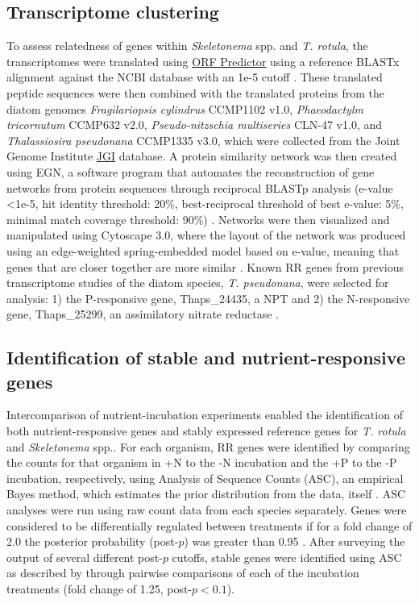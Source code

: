 \subsection{Transcriptome clustering}
To assess relatedness of genes within \textit{Skeletonema} spp. and \textit{T. rotula}, the transcriptomes were translated using \href{http://proteomics.ysu.edu/tools/OrfPredictor.html}{ORF Predictor} using a reference BLASTx alignment against the NCBI database with an 1e-5 cutoff \citep{Min2005}. These translated peptide sequences were then combined with the translated proteins from the diatom genomes \textit{Fragilariopsis cylindrus} CCMP1102 v1.0, \textit{Phaeodactylm tricornutum} CCMP632 v2.0, \textit{Pseudo-nitzschia multiseries} CLN-47 v1.0, and \textit{Thalassiosira pseudonana} CCMP1335 v3.0, which were collected from the Joint Genome Institute \href{http://genome.jgi-psf.org}{JGI} database. A protein similarity network was then created using EGN, a software program that automates the reconstruction of gene networks from protein sequences through reciprocal BLASTp analysis (e-value <1e-5, hit identity threshold: 20\%, best-reciprocal threshold of best e-value: 5\%, minimal match coverage threshold: 90\%) \citep{Halary2013, Halary2010}. Networks were then visualized and manipulated using Cytoscape 3.0, where the layout of the network was produced using an edge-weighted spring-embedded model based on e-value, meaning that genes that are closer together are more similar \citep{Smoot2011, Saito2012}. Known RR genes from previous transcriptome studies of the diatom species, \textit{T. pseudonana}, were selected for analysis: 1) the P-responsive gene, Thaps\_24435, a NPT \citep{Dyhrman2012} and 2) the N-responsive gene, Thaps\_25299, an assimilatory nitrate reductase \citep{Bender2014}. 
\subsection{Identification of stable and nutrient-responsive genes}
Intercomparison of nutrient-incubation experiments enabled the identification of both nutrient-responsive genes and stably expressed reference genes for \textit{T. rotula} and \textit{Skeletonema} spp.. For each organism, RR genes were identified by comparing the counts for that organism in +N to the -N incubation and the +P to the -P incubation, respectively, using Analysis of Sequence Counts (ASC), an empirical Bayes method, which estimates the prior distribution from the data, itself \citep{Wu2010}. ASC analyses were run using raw count data from each species separately. Genes were considered to be differentially regulated between treatments if for a fold change of 2.0 the posterior probability (post-$p$) was greater than 0.95 \citep{Dyhrman2012}. After surveying the output of several different post-$p$ cutoffs, stable genes were identified using ASC as described by \citet{Alexander2012} through pairwise comparisons of each of the incubation treatments (fold change of 1.25, post-$p < 0.1$).
 
